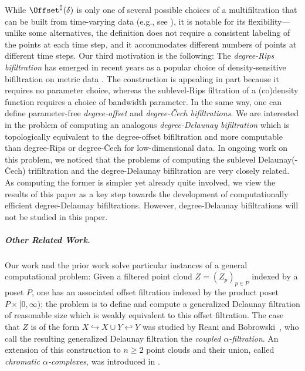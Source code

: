While $\Offset^{\updownarrow}(\delta)$ is only one of several possible choices of a multifiltration that can be built from time-varying data (e.g., see \cite{kim2021spatiotemporal,strommen2023topological}), it is notable for its flexibility---unlike some alternatives, the definition does not require a consistent labeling of the points at each time step, and it accommodates different numbers of points at different time steps.
%
Our third motivation is the following: The \emph{degree-Rips bifiltration} has emerged in recent years as a popular choice of density-sensitive bifiltration on metric data \cite{rolle2024stable,blumberg2024stability,lesnick2015interactive}. The construction is appealing in part because it requires no parameter choice, whereas the sublevel-Rips filtration of a (co)density function requires a choice of bandwidth parameter. In the same way, one can define parameter-free \emph{degree-offset} and \emph{degree-\v{C}ech bifiltrations}. We are interested in the problem of computing an analogous \emph{degree-Delaunay bifiltration} which is topologically equivalent to the degree-offset bifiltration and more computable than degree-Rips or degree-\v{C}ech for low-dimensional data. In ongoing work on this problem, we noticed that the problems of computing the sublevel Delaunay(-\v{C}ech) trifiltration and the degree-Delaunay bifiltration are very closely related. As computing the former is simpler yet already quite involved, we view the results of this paper as a key step towards the development of computationally efficient degree-Delaunay bifiltrations. However, degree-Delaunay bifiltrations will not be studied in this paper.
%
\subparagraph{Other Related Work.}
Our work and the prior work \cite{alonsoDelaunayBifiltrationsFunctions2024} solve particular instances of a general computational problem: Given a filtered point cloud $Z=(Z_p)_{p\in P}$ indexed by a poset $P$, one has an associated offset filtration indexed by the product poset $P\times [0,\infty)$; the problem is to define and compute a generalized Delaunay filtration of reasonable size which is weakly equivalent to this offset filtration.  The case that $Z$ is of the form $X \hookrightarrow X\cup Y \hookleftarrow Y$ was studied by Reani and Bobrowski~\cite{reaniCoupledAlphaComplex2023}, who call the resulting generalized Delaunay filtration the \emph{coupled $\alpha$-filtration}.  
An extension of this construction to $n\geq 2$ 
point clouds and their union, called \emph{chromatic $\alpha$-complexes}, was introduced in \cite{dimontesanoChromaticAlphaComplexes2024,biswasSizeChromaticDelaunay2022}. 
